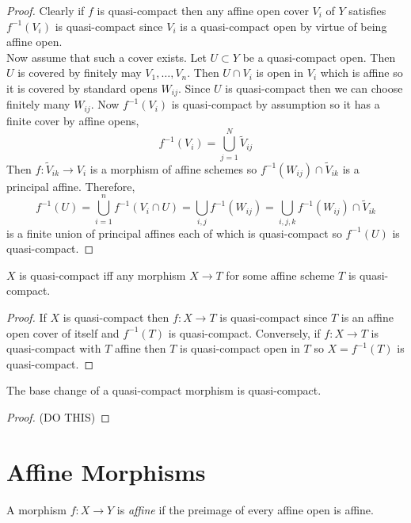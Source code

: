 \documentclass[12pt]{article}
\begin{document}
\begin{proof}
Clearly if $f$ is quasi-compact then any affine open cover $V_i$ of $Y$ satisfies $f^{-1}(V_i)$ is quasi-compact since $V_i$ is a quasi-compact open by virtue of being affine open.
\bigskip\\
Now assume that such a cover exists. Let $U \subset Y$ be a quasi-compact open. Then $U$ is covered by finitely may $V_1, \dots, V_n$. Then $U \cap V_i$ is open in $V_i$ which is affine so it is covered by standard opens $W_{ij}$. Since $U$ is quasi-compact then we can choose finitely many $W_{ij}$. Now $f^{-1}(V_i)$ is quasi-compact by assumption so it has a finite cover by affine opens,
\[ f^{-1}(V_i) = \bigcup_{j = 1}^N \tilde{V}_{ij} \]
Then $f : \tilde{V}_{ik} \to V_i$ is a morphism of affine schemes so $f^{-1}(W_{ij}) \cap \tilde{V}_{ik}$ is a principal affine. Therefore,
\[ f^{-1}(U) = \bigcup_{i = 1}^n f^{-1}(V_i \cap U) = \bigcup_{i,j} f^{-1}(W_{ij}) = \bigcup_{i,j,k} f^{-1}(W_{ij}) \cap \tilde{V}_{ik} \]
is a finite union of principal affines each of which is quasi-compact so $f^{-1}(U)$ is quasi-compact. 
\end{proof}

\begin{proposition}
$X$ is quasi-compact iff any morphism $X \to T$ for some affine scheme $T$ is quasi-compact.
\end{proposition}

\begin{proof}
If $X$ is quasi-compact then $f : X \to T$ is quasi-compact since $T$ is an affine open cover of itself and $f^{-1}(T)$ is quasi-compact. Conversely, if $f : X \to T$ is quasi-compact with $T$ affine then $T$ is quasi-compact open in $T$ so $X = f^{-1}(T)$ is quasi-compact.
\end{proof}

\begin{lemma}
The base change of a quasi-compact morphism is quasi-compact.
\end{lemma}

\begin{proof}
(DO THIS)
\end{proof}

\section{Affine Morphisms}

\begin{defn}
A morphism $f : X \to Y$ is \textit{affine} if the preimage of every affine open is affine.
\end{defn}
\end{document}
